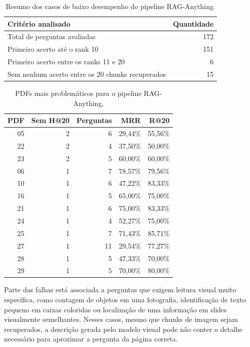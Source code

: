 \begin{table}[htbp]
\centering
\caption{Resumo dos casos de baixo desempenho do pipeline RAG-Anything.}
\label{tab:baixo-desempenho-raganything}
\small
\begin{tabular}{p{9.0cm}r}
\toprule
\textbf{Critério analisado} & \textbf{Quantidade} \\
\midrule
Total de perguntas avaliadas & 172 \\
Primeiro acerto até o rank 10 & 151 \\
Primeiro acerto entre os ranks 11 e 20 & 6 \\
Sem nenhum acerto entre os 20 chunks recuperados & 15 \\
\bottomrule
\end{tabular}
\end{table}

\begin{table}[htbp]
\centering
\caption{PDFs mais problemáticos para o pipeline RAG-Anything.}
\label{tab:pdfs-problematicos-raganything}
\small
\begin{tabular}{r r r r r}
\toprule
\textbf{PDF} & \textbf{Sem H@20} & \textbf{Perguntas} & \textbf{MRR} & \textbf{R@20} \\
\midrule
05 & 2 & 6 & 29,44\% & 55,56\% \\
22 & 2 & 4 & 37,50\% & 50,00\% \\
23 & 2 & 5 & 60,00\% & 60,00\% \\
06 & 1 & 7 & 78,57\% & 79,56\% \\
10 & 1 & 6 & 47,22\% & 83,33\% \\
16 & 1 & 5 & 65,00\% & 75,00\% \\
21 & 1 & 6 & 75,00\% & 83,33\% \\
24 & 1 & 4 & 52,27\% & 75,00\% \\
25 & 1 & 7 & 71,43\% & 85,71\% \\
27 & 1 & 11 & 29,54\% & 77,27\% \\
28 & 1 & 5 & 47,33\% & 70,00\% \\
29 & 1 & 5 & 70,00\% & 80,00\% \\
\bottomrule
\end{tabular}
\end{table}

Parte das falhas está associada a perguntas que exigem leitura visual muito específica, como contagem de objetos em uma fotografia, identificação de texto pequeno em caixas coloridas ou localização de uma informação em slides visualmente semelhantes. Nesses casos, mesmo que chunks de imagem sejam recuperados, a descrição gerada pelo modelo visual pode não conter o detalhe necessário para aproximar a pergunta da página correta.

